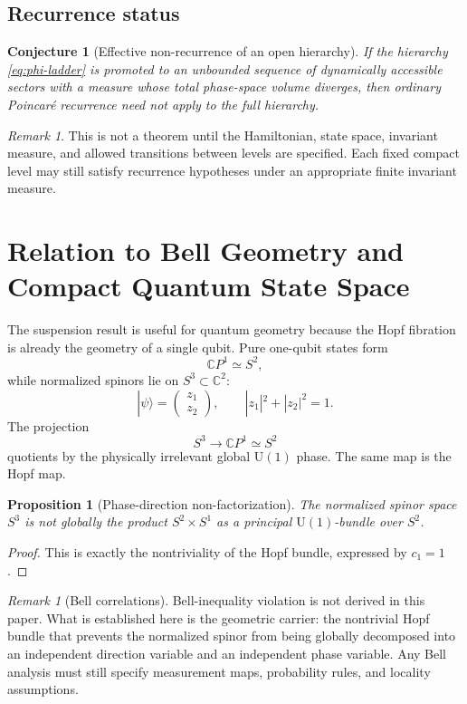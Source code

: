 \documentclass[11pt,a4paper]{article}
\newtheorem{proposition}[theorem]{Proposition}
\newtheorem{conjecture}[theorem]{Conjecture}
\theoremstyle{definition}
\theoremstyle{remark}
\newtheorem{remark}[theorem]{Remark}
\newcommand{\Sone}{S^{1}}
\newcommand{\Stwo}{S^{2}}
\newcommand{\Sthree}{S^{3}}
\newcommand{\CP}{\mathbb{C}P}
\newcommand{\C}{\mathbb{C}}
\newcommand{\U}{\mathrm{U}}
\begin{document}
\subsection{Recurrence status}

\begin{conjecture}[Effective non-recurrence of an open hierarchy]
If the hierarchy \eqref{eq:phi-ladder} is promoted to an unbounded sequence of dynamically
accessible sectors with a measure whose total phase-space volume diverges, then ordinary
Poincaré recurrence need not apply to the full hierarchy.
\end{conjecture}

\begin{remark}
This is not a theorem until the Hamiltonian, state space, invariant measure, and allowed
transitions between levels are specified.  Each fixed compact level may still satisfy recurrence
hypotheses under an appropriate finite invariant measure.
\end{remark}

\section{Relation to Bell Geometry and Compact Quantum State Space}

The suspension result is useful for quantum geometry because the Hopf fibration is already the
geometry of a single qubit.  Pure one-qubit states form
\[
\CP^{1}\simeq\Stwo,
\]
while normalized spinors lie on $\Sthree\subset\C^{2}$:
\[
|\psi\rangle =
\begin{pmatrix}
z_{1}\\ z_{2}
\end{pmatrix},
\qquad |z_{1}|^{2}+|z_{2}|^{2}=1.
\]
The projection
\[
\Sthree\to\CP^{1}\simeq\Stwo
\]
quotients by the physically irrelevant global $\U(1)$ phase.  The same map is the Hopf map.

\begin{proposition}[Phase-direction non-factorization]
The normalized spinor space $\Sthree$ is not globally the product $\Stwo\times\Sone$ as a
principal $\U(1)$-bundle over $\Stwo$.
\end{proposition}

\begin{proof}
This is exactly the nontriviality of the Hopf bundle, expressed by $c_{1}=1$.
\end{proof}

\begin{remark}[Bell correlations]
Bell-inequality violation is not derived in this paper.  What is established here is the geometric
carrier: the nontrivial Hopf bundle that prevents the normalized spinor from being globally
decomposed into an independent direction variable and an independent phase variable.  Any Bell
analysis must still specify measurement maps, probability rules, and locality assumptions.
\end{remark}
\end{document}
